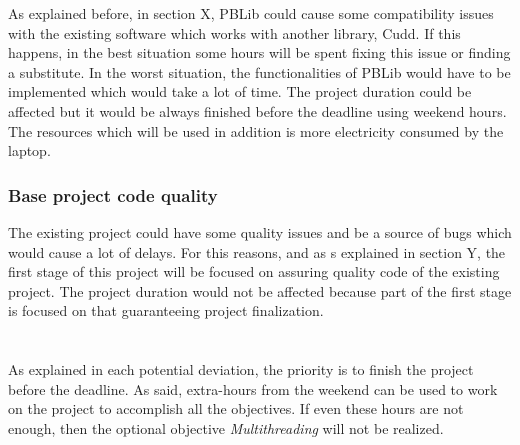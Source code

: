 As explained before, in section X, PBLib could cause some compatibility issues with the existing software which works with another library, Cudd. 
If this happens, in the best situation some hours will be spent fixing this issue or finding a substitute. In the worst situation, the functionalities of PBLib would have to be implemented which would take a lot of time. The project duration could be affected but it would be always finished before the deadline using weekend hours. The resources which will be used in addition is more electricity consumed by the laptop.

\subsubsection{Base project code quality}
The existing project could have some quality issues and be a source of bugs which would cause a lot of delays. For this reasons, and as s explained in section Y, the first stage of this project will be focused on assuring quality code of the existing project.  The project duration would not be affected because part of the first stage is focused on that guaranteeing project finalization.\\\\\\

As explained in each potential deviation, the priority is to finish the project before the deadline.  As said, extra-hours from the weekend can be used to work on the project to accomplish all the objectives. If even these hours are not enough, then the optional objective \emph{Multithreading} will not be realized. 